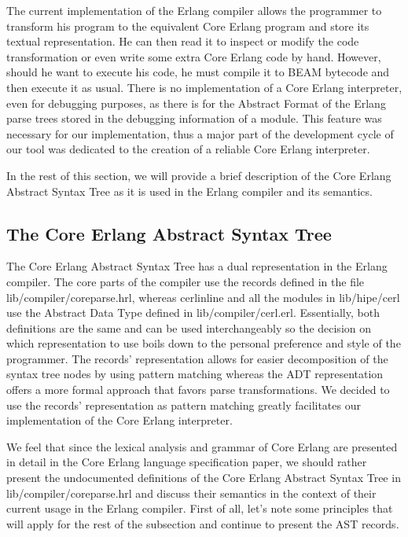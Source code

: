 The current implementation of the Erlang compiler allows the programmer to
transform his program to the equivalent Core Erlang program and store its
textual representation. He can then read it to inspect or modify the code
transformation or even write some extra Core Erlang code by hand. However,
should he want to execute his code, he must compile it to BEAM bytecode and
then execute it as usual. There is no implementation of a Core Erlang
interpreter, even for debugging purposes, as there is for the Abstract Format
of the Erlang parse trees stored in the debugging information of a module. This
feature was necessary for our implementation, thus a major part of the
development cycle of our tool was dedicated to the creation of a reliable Core
Erlang interpreter.

In the rest of this section, we will provide a brief description of the Core
Erlang Abstract Syntax Tree as it is used in the Erlang compiler and its
semantics.

\subsection{The Core Erlang Abstract Syntax Tree}\label{sub:core_erlang_ast}

The Core Erlang Abstract Syntax Tree has a dual representation in the Erlang
compiler. The core parts of the compiler use the records defined in the file
lib/compiler/core\textunderscore parse.hrl, whereas cerl\textunderscore inline and all the modules in
lib/hipe/cerl use the Abstract Data Type defined in lib/compiler/cerl.erl.
Essentially, both definitions are the same and can be used interchangeably so
the decision on which representation to use boils down to the personal
preference and style of the programmer. The records’ representation allows for
easier decomposition of the syntax tree nodes by using pattern matching whereas
the ADT representation offers a more formal approach that favors parse
transformations. We decided to use the records’ representation as pattern
matching greatly facilitates our implementation of the Core Erlang interpreter.

We feel that since the lexical analysis and grammar of Core Erlang are
presented in detail in the Core Erlang language specification paper, we should
rather present the undocumented definitions of the Core Erlang Abstract Syntax
Tree in lib/compiler/core\textunderscore parse.hrl and discuss their semantics in the context
of their current usage in the Erlang compiler. First of all, let’s note some
principles that will apply for the rest of the subsection and continue to
present the AST records.


